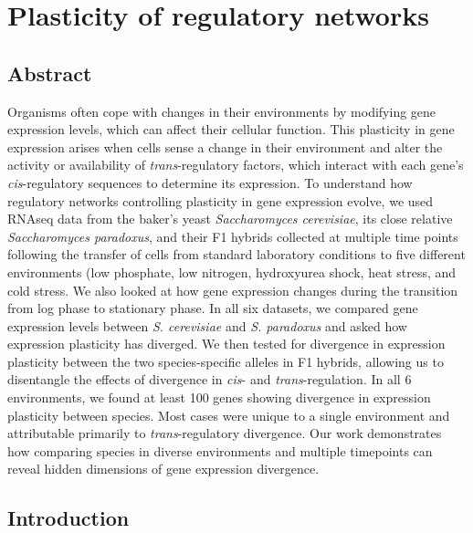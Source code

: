 \chapter{Plasticity of regulatory networks}
\label{chpt:plasticity}

\section{Abstract}

Organisms often cope with changes in their environments by modifying gene expression levels, which can affect their cellular function. This plasticity in gene expression arises when cells sense a change in their environment and alter the activity or availability of \textit{trans}-regulatory factors, which interact with each gene’s \textit{cis}-regulatory sequences to determine its expression. To understand how regulatory networks controlling plasticity in gene expression evolve, we used RNAseq data from the baker’s yeast \textit{Saccharomyces cerevisiae}, its close relative \textit{Saccharomyces paradoxus}, and their F1 hybrids collected at multiple time points following the transfer of cells from standard laboratory conditions to five different environments (low phosphate, low nitrogen, hydroxyurea shock, heat stress, and cold stress. We also looked at how gene expression changes during the transition from log phase to stationary phase. In all six datasets, we compared gene expression levels between  \textit{S. cerevisiae} and  \textit{S. paradoxus} and asked how expression plasticity has diverged. We then tested for divergence in expression plasticity between the two species-specific alleles in F1 hybrids, allowing us to disentangle the effects of divergence in \textit{cis}- and \textit{trans}-regulation. In all 6 environments, we found at least 100 genes showing divergence in expression plasticity between species. Most cases were unique to a single environment and attributable primarily to  \textit{trans}-regulatory divergence. Our work demonstrates how comparing species in diverse environments and multiple timepoints can reveal hidden dimensions of gene expression divergence.

\section{Introduction}

